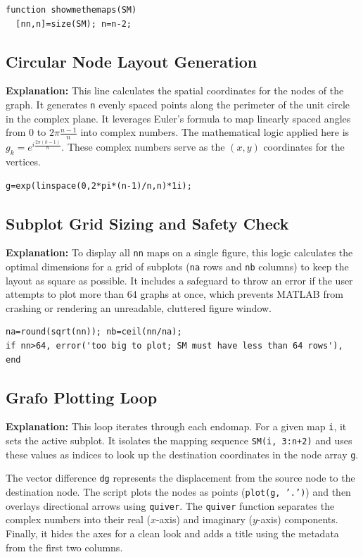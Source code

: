 \begin{lstlisting}
function showmethemaps(SM)
  [nn,n]=size(SM); n=n-2;
\end{lstlisting}

\subsection{Circular Node Layout Generation}
\textbf{Explanation:} This line calculates the spatial coordinates for the nodes of the graph. It generates \texttt{n} evenly spaced points along the perimeter of the unit circle in the complex plane. It leverages Euler's formula to map linearly spaced angles from $0$ to $2\pi \frac{n-1}{n}$ into complex numbers. The mathematical logic applied here is $g_k = e^{i \frac{2\pi (k-1)}{n}}$. These complex numbers serve as the $(x, y)$ coordinates for the vertices.

\begin{lstlisting}
g=exp(linspace(0,2*pi*(n-1)/n,n)*1i);
\end{lstlisting}

\subsection{Subplot Grid Sizing and Safety Check}
\textbf{Explanation:} To display all \texttt{nn} maps on a single figure, this logic calculates the optimal dimensions for a grid of subplots (\texttt{na} rows and \texttt{nb} columns) to keep the layout as square as possible. It includes a safeguard to throw an error if the user attempts to plot more than 64 graphs at once, which prevents MATLAB from crashing or rendering an unreadable, cluttered figure window.

\begin{lstlisting}
na=round(sqrt(nn)); nb=ceil(nn/na);
if nn>64, error('too big to plot; SM must have less than 64 rows'), end
\end{lstlisting}

\subsection{Grafo Plotting Loop}
\textbf{Explanation:} This loop iterates through each endomap. For a given map \texttt{i}, it sets the active subplot. It isolates the mapping sequence \texttt{SM(i, 3:n+2)} and uses these values as indices to look up the destination coordinates in the node array \texttt{g}. 

The vector difference \texttt{dg} represents the displacement from the source node to the destination node. The script plots the nodes as points (\texttt{plot(g, '.')}) and then overlays directional arrows using \texttt{quiver}. The \texttt{quiver} function separates the complex numbers into their real ($x$-axis) and imaginary ($y$-axis) components. Finally, it hides the axes for a clean look and adds a title using the metadata from the first two columns.

